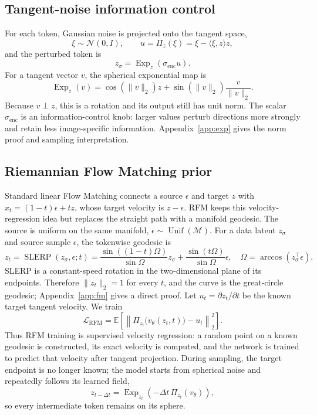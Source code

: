 \documentclass{article}
\begin{document}
\subsection{Tangent-noise information control}
For each token, Gaussian noise is projected onto the tangent space,
\begin{equation}
 \xi\sim\mathcal N(0,I),\qquad
 u=\Pi_z(\xi)=\xi-\langle\xi,z\rangle z,
\end{equation}
and the perturbed token is
\begin{equation}
 z_\sigma=\operatorname{Exp}_z(\sigma_{\mathrm{enc}}u).
\label{eq:noise}
\end{equation}
For a tangent vector $v$, the spherical exponential map is
\begin{equation}
 \operatorname{Exp}_z(v)=\cos(\|v\|_2)z+\sin(\|v\|_2)\frac{v}{\|v\|_2}.
\label{eq:exp}
\end{equation}
Because $v\perp z$, this is a rotation and its output still has unit norm. The scalar $\sigma_{\mathrm{enc}}$ is an information-control knob: larger values perturb directions more strongly and retain less image-specific information. Appendix~\ref{app:exp} gives the norm proof and sampling interpretation.

\subsection{Riemannian Flow Matching prior}
Standard linear Flow Matching connects a source $\epsilon$ and target $z$ with $x_t=(1-t)\epsilon+tz$, whose target velocity is $z-\epsilon$. RFM keeps this velocity-regression idea but replaces the straight path with a manifold geodesic. The source is uniform on the same manifold, $\epsilon\sim\operatorname{Unif}(\mathcal M)$. For a data latent $z_\sigma$ and source sample $\epsilon$, the tokenwise geodesic is
\begin{equation}
 z_t=\operatorname{SLERP}(z_\sigma,\epsilon;t)
 =\frac{\sin((1-t)\Omega)}{\sin\Omega}z_\sigma
 +\frac{\sin(t\Omega)}{\sin\Omega}\epsilon,
\quad \Omega=\arccos(z_\sigma^\top\epsilon).
\label{eq:slerp}
\end{equation}
SLERP is a constant-speed rotation in the two-dimensional plane of its endpoints. Therefore $\|z_t\|_2=1$ for every $t$, and the curve is the great-circle geodesic; Appendix~\ref{app:fm} gives a direct proof. Let $u_t=\partial z_t/\partial t$ be the known target tangent velocity. We train
\begin{equation}
 \mathcal L_{\mathrm{RFM}}
 =\mathbb E\!\left[\left\|\Pi_{z_t}\big(v_\theta(z_t,t)\big)-u_t\right\|_2^2\right].
\label{eq:rfm}
\end{equation}
Thus RFM training is supervised velocity regression: a random point on a known geodesic is constructed, its exact velocity is computed, and the network is trained to predict that velocity after tangent projection. During sampling, the target endpoint is no longer known; the model starts from spherical noise and repeatedly follows its learned field,
\begin{equation}
 z_{t-\Delta t}=\operatorname{Exp}_{z_t}\!\left(-\Delta t\,\Pi_{z_t}(v_\theta)\right),
\label{eq:sample}
\end{equation}
so every intermediate token remains on its sphere.
\end{document}
